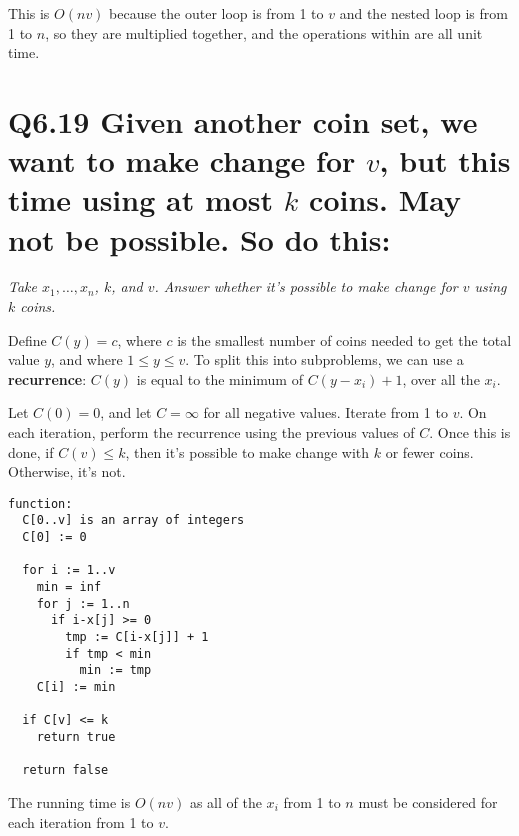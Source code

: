 \documentclass{article}
\begin{document}
This is $O(nv)$ because the outer loop is from 1 to $v$ and the nested loop is from 1 to $n$, so they are multiplied together, and the operations within are all unit time.

\pagebreak

\section*{Q6.19 \normalsize Given another coin set, we want to make change for $v$, but this time using at most $k$ coins. May not be possible. So do this:}

\textit{Take $x_1,\dots,x_n$, $k$, and $v$. Answer whether it's possible to make change for $v$ using $k$ coins.}

\smallskip

Define $C(y) = c$, where $c$ is the smallest number of coins needed to get the total value $y$, and where $1 \leq y \leq v$. To split this into subproblems, we can use a \textbf{recurrence}: $C(y)$ is equal to the minimum of $C(y-x_i) + 1$, over all the $x_i$.

Let $C(0) = 0$, and let $C = \infty$ for all negative values. Iterate from 1 to $v$. On each iteration, perform the recurrence using the previous values of $C$. Once this is done, if $C(v) \leq k$, then it's possible to make change with $k$ or fewer coins. Otherwise, it's not.

\begin{verbatim}
function:
  C[0..v] is an array of integers
  C[0] := 0
  
  for i := 1..v
    min = inf
    for j := 1..n
      if i-x[j] >= 0
        tmp := C[i-x[j]] + 1
        if tmp < min
          min := tmp
    C[i] := min

  if C[v] <= k
    return true

  return false
\end{verbatim}

The running time is $O(nv)$ as all of the $x_i$ from 1 to $n$ must be considered for each iteration from 1 to $v$.
\end{document}
